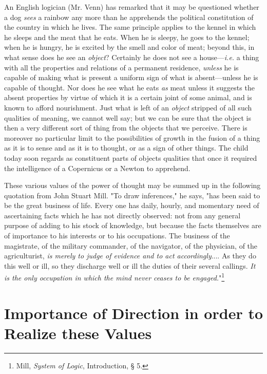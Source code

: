\documentclass[letterpaper]{book}
\begin{document}

An English logician (Mr. Venn) has remarked that it may be questioned
whether a dog \emph{sees} a rainbow any more than he apprehends the
political constitution of the country in which he lives. The same
principle applies to the kennel in which he sleeps and the meat that he
eats. When he is sleepy, he goes to the kennel; when he is hungry, he is
excited by the smell and color of meat; beyond this, in what sense does
he see an \emph{object}? Certainly he does not see a house---\emph{i.e.}
a thing with all the properties and relations of a permanent residence,
\emph{unless} he is capable of making what is present a uniform sign of
what is absent---unless he is capable of thought. Nor does he see what
he eats \emph{as} meat unless it suggests the absent properties by
virtue of which it is a certain joint of some animal, and is known to
afford nourishment. Just what is left of an \emph{object} stripped of
all such qualities of meaning, we cannot well say; but we can be sure
that the object is then a very different sort of thing from the objects
that we perceive.
There
is moreover no particular limit to the possibilities of growth in the
fusion of a thing as it is to sense and as it is to thought, or as a
sign of other things. The child today soon regards as constituent parts
of objects qualities that once it required the intelligence of a
Copernicus or a Newton to apprehend.


These various values of the power of thought may be summed up in the
following quotation from John Stuart Mill. "To draw inferences," he
says, "has been said to be the great business of life. Every one has
daily, hourly, and momentary need of ascertaining facts which he has not
directly observed: not from any general purpose of adding to his stock
of knowledge, but because the facts themselves are of importance to his
interests or to his occupations. The business of the magistrate, of the
military commander, of the navigator, of the physician, of the
agriculturist, \emph{is merely to judge of evidence and to act
accordingly}.... As they do this well or ill, so they discharge well or
ill the duties of their several callings. \emph{It is the only
occupation in which the mind never ceases to be
engaged.}"\footnote{Mill, \emph{System of Logic}, Introduction, § 5.}

\section{Importance of Direction in order to Realize these Values}
\end{document}
